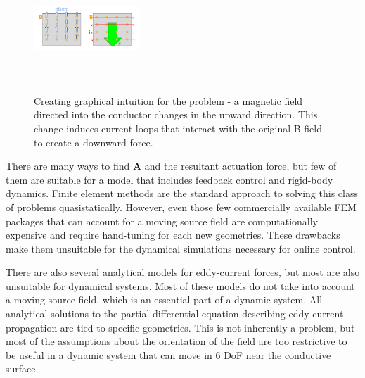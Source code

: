 

\begin{figure}
\includegraphics[width = 4cm, height = 4cm ]{figures/Eddy-Current-Force.png}
\label{fig:force_generation}
\caption{Creating graphical intuition for the problem - a magnetic field directed into the conductor changes in the upward direction. This change induces current loops that interact with the original B field to create a downward force.}
\end{figure}

There are many ways to find \textbf{A} and the resultant actuation force, but few of them are suitable for a model that includes feedback control and rigid-body dynamics. \cite{Paudel2013}
Finite element methods are the standard approach to solving this class of problems quasistatically. However, even those few commercially available FEM packages that can account for a moving source field are computationally expensive and require hand-tuning for each new geometries. These drawbacks make them unsuitable for the dynamical simulations necessary for online control. 

There are also several analytical models for eddy-current forces, but most are also unsuitable for dynamical systems. Most of these models do not take into account a moving source field, which is an essential part of a dynamic system. All analytical solutions to the partial differential equation describing eddy-current propagation are tied to specific geometries. This is not inherently a problem, but most of the assumptions about the orientation of the field are too restrictive to be useful in a dynamic system that can move in 6 DoF near the conductive surface. 

